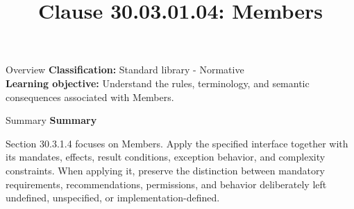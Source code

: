 \documentclass[10pt,letterpaper]{article}
\title{Clause 30.03.01.04: Members}
\author{}
\date{}
\begin{document}
\maketitle
\begin{CornellOverviewBox}{Overview}
\textbf{Classification:} Standard library - Normative\\[2pt]
\textbf{Learning objective:} Understand the rules, terminology, and semantic consequences associated with Members.
\end{CornellOverviewBox}\begin{CornellSummaryBox}{Summary}
{\sffamily\bfseries\color{Accent} Summary}\par\vspace{3pt}Section 30.3.1.4 focuses on Members. Apply the specified interface together with its mandates, effects, result conditions, exception behavior, and complexity constraints. When applying it, preserve the distinction between mandatory requirements, recommendations, permissions, and behavior deliberately left undefined, unspecified, or implementation-defined.
\end{CornellSummaryBox}
\end{document}

